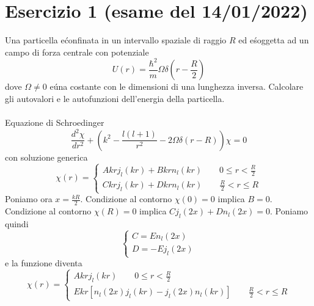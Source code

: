 \documentclass[a4paper]{article}
\begin{document}
    \section*{Esercizio 1 (esame del 14/01/2022)}
        Una particella e\' confinata in un intervallo spaziale di raggio $R$ ed e\' soggetta ad un campo di forza centrale con potenziale
        \begin{equation*}
            U(r)=\frac{\hbar^2}{m}\Omega\delta(r-\frac{R}{2})
        \end{equation*}
        dove $\Omega\neq 0$ e\' una costante con le dimensioni di una lunghezza inversa.
        Calcolare gli autovalori e le autofunzioni dell'energia della particella.
        \\
        \\
        Equazione di Schroedinger
        \begin{equation*}
            \frac{d^2\chi}{dr^2}+\left(k^2-\frac{l(l+1)}{r^2}-2\Omega\delta(r-R)\right)\chi=0
        \end{equation*}
        con soluzione generica
        \begin{equation*}
            \chi(r)=
            \begin{cases}
                Akrj_l(kr)+Bkrn_l(kr)\quad\quad 0\leq r<\frac{R}{2}\\
                Ckrj_l(kr)+Dkrn_l(kr)\quad\quad \frac{R}{2}<r\leq R
            \end{cases}
        \end{equation*}
        Poniamo ora $x=\frac{kR}{2}$.
        Condizione al contorno $\chi(0)=0$ implica $B=0$.
        Condizione al contorno $\chi(R)=0$ implica $Cj_l(2x)+Dn_l(2x)=0$.
        Poniamo quindi
        \begin{equation*}
            \begin{cases}
                C=En_l(2x)\\
                D=-Ej_l(2x)
            \end{cases}
        \end{equation*}
        e la funzione diventa
        \begin{equation*}
            \chi(r)=
            \begin{cases}
                Akrj_l(kr)\quad\quad 0\leq r<\frac{R}{2}\\
                Ekr\left[n_l(2x)j_l(kr)-j_l(2x)n_l(kr)\right]\quad\quad \frac{R}{2}<r\leq R
            \end{cases}
        \end{equation*}
\end{document}
